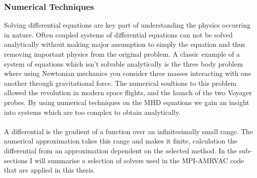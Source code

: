 \documentclass[12pt]{ociamthesis}
\begin{document}
\subsubsection{Numerical Techniques}
Solving differential equations are key part of understanding the physics occurring in nature. Often coupled systems of differential equations can not be solved analytically without making major assumption to simply the equation and thus removing important physics from the original problem. A classic example of a system of equations which isn't solvable analytically is the three body problem where using Newtonian mechanics you consider three masses interacting with one another through gravitational force. The numerical soultions to this problem allowed the revolution in modern space flights, and the launch of the two Voyager probes. By using numerical techniques on the MHD equations we gain an insight into systems which are too complex to obtain analytically.  \\ \\A differential is the gradient of a function over an infinitesimally small range. The numerical approximation takes this range and makes it finite, calculation the differential from an approximation dependent on the selected method. In the sub-sections I will summarise a selection of solvers used in the MPI-AMRVAC code that are applied in this thesis.
\end{document}
